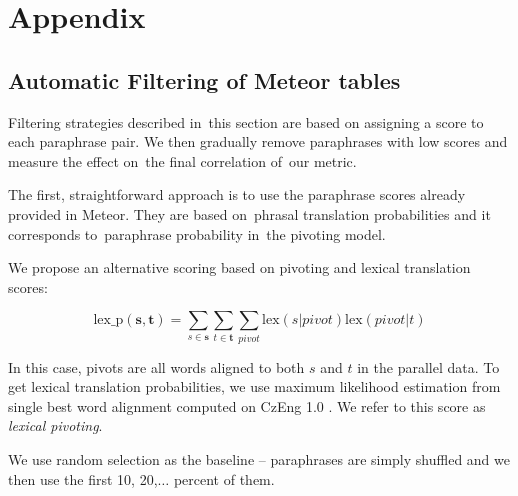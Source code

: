 \documentclass[11pt]{article}
\begin{document}
%




\section*{Appendix}
\label{multiword_filtering}
\subsection{Automatic Filtering of Meteor tables}
Filtering strategies described in~this section are based on assigning a score to
each paraphrase pair. We then gradually remove paraphrases with low scores and
measure the effect on~the final correlation of~our metric.

The first, straightforward approach is to use the paraphrase scores already
provided in Meteor. They are based on~phrasal translation probabilities
and it corresponds to~paraphrase probability in~the pivoting model.

We propose an alternative scoring based on pivoting and lexical translation
scores:

$$\text{lex\_p}(\mathbf{s},\mathbf{t}) = \sum_{s \in \mathbf{s}}\sum_{t \in
\mathbf{t}}\sum_{pivot}\text{lex}(s|pivot)\text{lex}(pivot|t)$$

In this case, pivots are all words aligned to both $s$ and $t$ in the parallel
data. To get lexical translation probabilities, we use maximum likelihood
estimation from single best word alignment computed on CzEng 1.0
\cite{czeng10:lrec2012}. We refer to this score as \emph{lexical
pivoting}.

We use random selection as the baseline -- paraphrases are simply shuffled and we
then use the first 10, 20,$\ldots$ percent of them.
\end{document}
